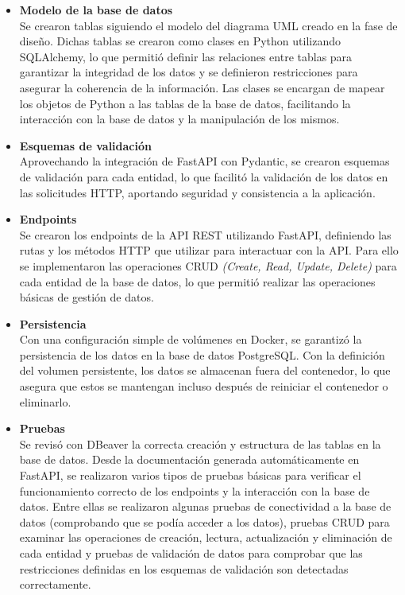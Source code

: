 \begin{itemize}
    \item \textbf{Modelo de la base de datos}\\
        Se crearon tablas siguiendo el modelo del diagrama UML creado en la fase de diseño. Dichas tablas se crearon como clases en Python utilizando SQLAlchemy, lo que permitió definir las relaciones entre tablas para garantizar la integridad de los datos y se definieron restricciones para asegurar la coherencia de la información. Las clases se encargan de mapear los objetos de Python a las tablas de la base de datos, facilitando la interacción con la base de datos y la manipulación de los mismos.

    \item \textbf{Esquemas de validación}\\
        Aprovechando la integración de FastAPI con Pydantic, se crearon esquemas de validación para cada entidad, lo que facilitó la validación de los datos en las solicitudes HTTP, aportando seguridad y consistencia a la aplicación.

    \item \textbf{Endpoints}\\
        Se crearon los endpoints de la API REST utilizando FastAPI, definiendo las rutas y los métodos HTTP que utilizar para interactuar con la API. Para ello se implementaron las operaciones CRUD \textit{(Create, Read, Update, Delete)} para cada entidad de la base de datos, lo que permitió realizar las operaciones básicas de gestión de datos.

    \item \textbf{Persistencia}\\
        Con una configuración simple de volúmenes en Docker, se garantizó la persistencia de los datos en la base de datos PostgreSQL. Con la definición del volumen persistente, los datos se almacenan fuera del contenedor, lo que asegura que estos se mantengan incluso después de reiniciar el contenedor o eliminarlo.

    \item \textbf{Pruebas}\\
        Se revisó con DBeaver la correcta creación y estructura de las tablas en la base de datos.
        Desde la documentación generada automáticamente en FastAPI, se realizaron varios tipos de pruebas básicas para verificar el funcionamiento correcto de los endpoints y la interacción con la base de datos. Entre ellas se realizaron algunas pruebas de conectividad a la base de datos (comprobando que se podía acceder a los datos), pruebas CRUD para examinar las operaciones de creación, lectura, actualización y eliminación de cada entidad y pruebas de validación de datos para comprobar que las restricciones definidas en los esquemas de validación son detectadas correctamente.
\end{itemize}

